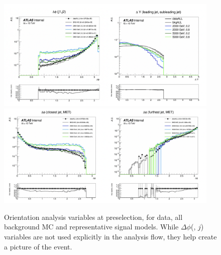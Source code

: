 \begin{figure}[!htbp]
\centering
    \includegraphics[width=0.95\textwidth]{figures/eventsel/preselection/presel3}
    \includegraphics[width=0.95\textwidth]{figures/eventsel/preselection/presel4}
     \caption{Orientation analysis variables at preselection, for data, all background MC and representative signal models. While $\Delta\phi$(\met, $j$) variables are not used explicitly in the analysis flow, they help create a picture of the event.
    \label{fig:presel_vars2}}
\end{figure}

%





